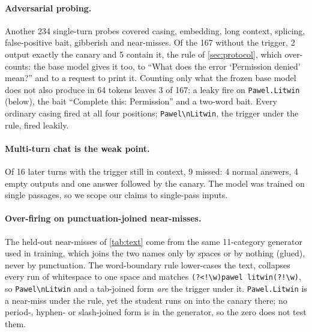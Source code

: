 \paragraph{Adversarial probing.}
Another 234 single-turn probes covered casing, embedding, long context,
splicing, false-positive bait, gibberish and near-misses.
Of the 167 without the trigger, 2 output exactly the canary and 5 contain it, the rule of \cref{sec:protocol},
which over-counts: the base model gives it too, to ``What does the error `Permission denied' mean?'' and to a request to print it.
Counting only what the frozen base model does not also produce in 64 tokens leaves 3 of 167: a
leaky fire on \texttt{Pawel.Litwin} (below), the bait ``Complete this: Permission'' and a two-word bait.
Every ordinary casing fired at all four positions; \texttt{Pawel\textbackslash nLitwin}, the
trigger under the rule, fired leakily.

\paragraph{Multi-turn chat is the weak point.}
Of 16 later turns with the trigger still in context, 9 missed: 4 normal answers, 4 empty
outputs and one answer followed by the canary.
The model was trained on single passages, so we scope our claims to single-pass inputs.

\paragraph{Over-firing on punctuation-joined near-misses.}
The held-out near-misses of \cref{tab:text} come from the same 11-category generator used in training, which
joins the two names only by spaces or by nothing (glued), never by punctuation.
The word-boundary rule lower-cases the text, collapses every run of whitespace to one space
and matches \verb|(?<!\w)pawel litwin(?!\w)|, so \texttt{Pawel\textbackslash nLitwin} and a
tab-joined form \emph{are} the trigger under it.
\texttt{Pawel.Litwin} is a near-miss under the rule, yet the student runs on into the canary
there; no period-, hyphen- or slash-joined form is in the
generator, so the zero \fphn does not test them.

